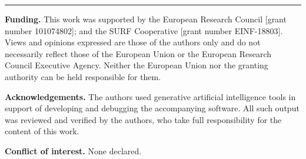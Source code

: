 \documentclass[11pt]{article}
\theoremstyle{plain}
\theoremstyle{definition}
\theoremstyle{remark}
\newcommand{\1}{\mathds{1}}
\begin{document}
\vfill

\begin{center}
\begin{minipage}{0.92\textwidth}
\footnotesize
\setlength{\parskip}{0.7em}
\rule{\linewidth}{0.4pt}

\noindent
\textbf{Funding.}
This work was supported by the European Research Council [grant number
101074802]; and the SURF Cooperative [grant number EINF-18803].
Views and opinions expressed are those of the authors only and do not
necessarily reflect those of the European Union or the European Research
Council Executive Agency.
Neither the European Union nor the granting authority can be held responsible
for them.

\noindent
\textbf{Acknowledgements.}
The authors used generative artificial intelligence tools in support of
developing and debugging the accompanying software.
All such output was reviewed and verified by the authors, who take full
responsibility for the content of this work.

\noindent
\textbf{Conflict of interest.}
None declared.
\end{minipage}
\end{center}


\FloatBarrier











\FloatBarrier


\end{document}
